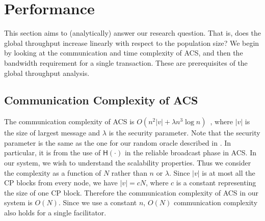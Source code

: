 \section{Performance}
This section aims to (analytically) answer our research question.
That is, does the global throughput increase linearly with respect to the population size?
We begin by looking at the communication and time complexity of ACS,
and then the bandwidth requirement for a single transaction.
These are prerequisites of the global throughput analysis.

\subsection{Communication Complexity of ACS}
\label{sec:acs-complexity}
The communication complexity of ACS is $O(n^2|v| + \lambda n^3 \log n)$~\cite{miller2016honey},
where $|v|$ is the size of largest message and $\lambda$ is the security parameter.
Note that the security parameter is the same as the one for our random oracle described in .
In particular, it is from the use of $\textsf{H}(\cdot)$ in the reliable broadcast phase in ACS.
In our system, we wish to understand the scalability properties.
Thus we consider the complexity as a function of $N$ rather than $n$ or $\lambda$.
Since $|v|$ is at most all the CP blocks from every node, we have $|v| = cN$,
where $c$ is a constant representing the size of one CP block.
Therefore the communication complexity of ACS in our system is $O(N)$.
Since we use a constant $n$, $O(N)$ communication complexity also holds for a single facilitator.


